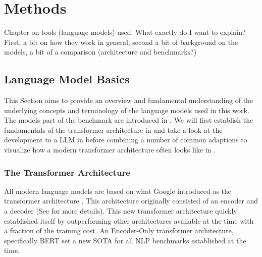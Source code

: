 \chapter{Methods}\label{chap:methods}
{\color{blue}
Chapter on tools (language models) used. What exactly do I want to explain?
First, a bit on how they work in general, second a bit of background on the models, a bit of a comparison (architecture and benchmarks?)
}


\section{Language Model Basics}\label{sec:basics}
This Section aims to provide an overview and fundamental understanding of the underlying concepts and terminology of the language models used in this work.
The models part of the benchmark are introduced in .
We will first establish the fundamentals of the transformer architecture in  and take a look at the development to a \acrlong{LLM} in  before combining a number of common adaptions to visualize how a modern transformer architecture often looks like in .



\subsection{The Transformer Architecture}\label{sub:transformer}
All modern language models are based on what Google introduced as the transformer architecture \cite{vaswani_attention_2017}. 
This architecture originally consisted of an encoder and a decoder (See  for more details).
This new transformer architecture quickly established itself by outperforming other architectures available at the time with a fraction of the training cost.
An Encoder-Only transformer architecture, specifically \gls{BERT} set a new \gls{SOTA} for all \gls{NLP} benchmarks established at the time.


